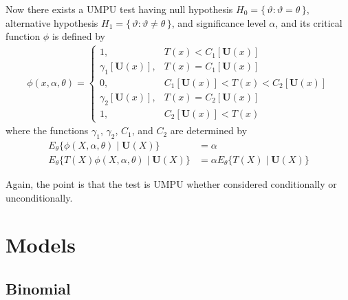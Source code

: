 \documentclass{article}
\newcommand{\set}[1]{\{\, #1 \,\}}
\begin{document}
Now there exists a UMPU test
having null hypothesis $H_0 = \set{ \vartheta : \vartheta = \theta }$,
alternative hypothesis $H_1 = \set{ \vartheta : \vartheta \neq \theta }$,
and significance level $\alpha$,
and its critical function $\phi$ is defined by
\begin{equation} \label{eq:crit-two}
\begin{split}
   \phi(x, \alpha, \theta)
   =
   \begin{cases}
   1, & T(x) < C_1[\mathbf{U}(x)]
   \\
   \gamma_1[\mathbf{U}(x)], & T(x) = C_1[\mathbf{U}(x)]
   \\
   0, & C_1[\mathbf{U}(x)] < T(x) < C_2[\mathbf{U}(x)]
   \\
   \gamma_2[\mathbf{U}(x)], & T(x) = C_2[\mathbf{U}(x)]
   \\
   1, & C_2[\mathbf{U}(x)] < T(x)
   \end{cases}
\end{split}
\end{equation}
where the functions $\gamma_1$, $\gamma_2$, $C_1$, and $C_2$ are determined by
\begin{subequations}
\begin{align}
   E_\theta\{\phi(X, \alpha, \theta) \mid \mathbf{U}(X) \} & = \alpha
   \label{eq:cond-two-a}
   \\
   E_\theta\{T(X) \phi(X, \alpha, \theta) \mid \mathbf{U}(X) \} & = \alpha
   E_\theta\{T(X) \mid \mathbf{U}(X) \}
   \label{eq:cond-two-b}
\end{align}
\end{subequations}

Again, the point
is that the test is UMPU whether considered conditionally or unconditionally.


\section{Models}

\subsection{Binomial}
\end{document}

